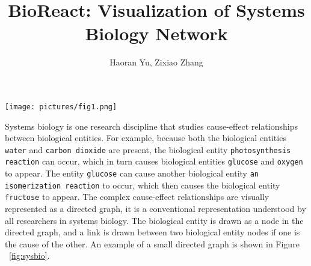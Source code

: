 \documentclass[journal]{vgtc}                %
\title{BioReact: Visualization of Systems Biology Network}
\author{Haoran Yu, Zixiao Zhang}
\begin{document}



\maketitle

\begin{figure*}[!htbp]
\centering
\texttt{[image: pictures/fig1.png]}
\caption{An example of a systems biology directed graph. There are 7 nodes and 6 links. The 7 nodes correspond to 7 entities in the systems biology cause-effect relationships network. As will be explained later, there are 2 categories of entities: a Species entity (encoded as circles) and a Reaction entity (encoded as rectangles). }
\label{fig:sysbio}
\end{figure*}

Systems biology is one research discipline that studies cause-effect relationships between biological entities. For example, because both the biological entities \texttt{water} and \texttt{carbon dioxide} are present, the biological entity \texttt{photosynthesis reaction} can occur, which in turn causes biological entities \texttt{glucose} and \texttt{oxygen} to appear. The entity \texttt{glucose} can cause another biological entity \texttt{an isomerization reaction} to occur, which then causes the biological entity \texttt{fructose} to appear. The complex cause-effect relationships are visually represented as a directed graph, it is a conventional representation understood by all researchers in systems biology. The biological entity is drawn as a node in the directed graph, and a link is drawn between two biological entity nodes if one is the cause of the other. An example of a small directed graph is shown in Figure ~\ref{fig:sysbio}.
\end{document}
